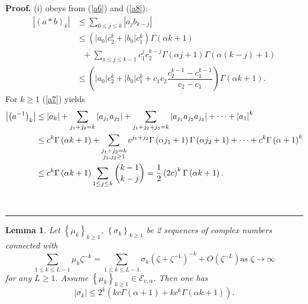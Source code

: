 \documentclass[a4paper]{article}%
\newtheorem{lemma}{Lemma}
\newenvironment{proof}[1][Proof]{\noindent\textbf{#1.} }{\ \rule{0.5em}{0.5em}}
\begin{document}
\begin{proof}
(i) obeys from (\ref{a6}) and (\ref{a8}):%
\begin{align*}
\left\vert \left(  a\ast b\right)  _{k}\right\vert  &  \leq\sum_{0\leq j\leq
k}\left\vert a_{j}b_{k-j}\right\vert \\
&  \leq\left(  \left\vert a_{0}\right\vert c_{2}^{k}+\left\vert b_{0}%
\right\vert c_{1}^{k}\right)  \Gamma\left(  \alpha k+1\right) \\
&  \text{ \ \ \ \ \ \ \ }+\sum_{1\leq j\leq k-1}c_{1}^{j}c_{2}^{k-j}%
\Gamma\left(  \alpha j+1\right)  \Gamma\left(  \alpha\left(  k-j\right)
+1\right) \\
&  \leq\left(  \left\vert a_{0}\right\vert c_{2}^{k}+\left\vert b_{0}%
\right\vert c_{1}^{k}+c_{1}c_{2}\dfrac{c_{2}^{k-1}-c_{1}^{k-1}}{c_{2}-c_{1}%
}\right)  \Gamma\left(  \alpha k+1\right)  \text{.}%
\end{align*}
For $k\geq1$ (\ref{a7}) yields%
\begin{align*}
\left\vert \left(  a^{-1}\right)  _{k}\right\vert  &  \leq\left\vert
a_{k}\right\vert +\sum_{j_{1}+j_{2}=k}\left\vert a_{j_{1}}a_{j_{2}}\right\vert
+\sum_{j_{1}+j_{2}+j_{3}=k}\left\vert a_{j_{1}}a_{j_{2}}a_{j_{3}}\right\vert
+\cdots+\left\vert a_{1}\right\vert ^{k}\\
&  \leq c^{k}\Gamma\left(  \alpha k+1\right)  +\sum_{\substack{j_{1}%
+j_{2}=k\\j_{1},j_{2}\geq1}}c^{j_{1}+j_{2}}\Gamma\left(  \alpha j_{1}%
+1\right)  \Gamma\left(  \alpha j_{2}+1\right)  +\cdots+c^{k}\Gamma\left(
\alpha+1\right)  ^{k}\\
&  \leq c^{k}\Gamma\left(  \alpha k+1\right)  \sum_{1\leq j\leq k}\dbinom
{k-1}{k-j}=\dfrac{1}{2}\left(  2c\right)  ^{k}\Gamma\left(  \alpha k+1\right)
\text{.}%
\end{align*}

\end{proof}

\begin{lemma}
\label{a-3}Let $\left\{  \mu_{k}\right\}  _{k\geq1}$, $\left\{  \sigma
_{k}\right\}  _{k\geq1}$ be 2 sequences of complex numbers connected with%
\[
\sum_{1\leq k\leq L-1}\mu_{k}\zeta^{-k}=\sum_{1\leq k\leq L-1}\sigma
_{k}\left(  \zeta+\zeta^{-1}\right)  ^{-k}+O\left(  \zeta^{-L}\right)  \text{
as }\zeta\rightarrow\infty
\]
for any $L\geq1$. Assume $\left\{  \mu_{k}\right\}  _{k\geq1}\in
\mathcal{E}_{c,\alpha}$. Then one has%
\begin{equation}
\left\vert \sigma_{k}\right\vert \leq2^{k}\left(  kc\Gamma\left(
\alpha+1\right)  +kc^{k}\Gamma\left(  \alpha k+1\right)  \right)  \text{.}
\label{a9}%
\end{equation}

\end{lemma}
\end{document}

